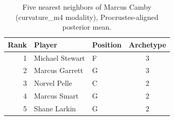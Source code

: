 \begin{table}[htbp]
  \centering\small
  \begin{tabular}{rllc}
    \toprule
    Rank & Player & Position & Archetype \\
    \midrule
    1 & Michael Stewart & F & 3 \\
    2 & Marcus Garrett & G & 3 \\
    3 & Norvel Pelle & C & 2 \\
    4 & Marcus Smart & G & 2 \\
    5 & Shane Larkin & G & 2 \\
    \bottomrule
  \end{tabular}
  \caption{Five nearest neighbors of Marcus Camby (curvature_m4 modality), Procrustes-aligned posterior mean.}
  \label{tab:Marcus_Camby_neighbors_curvature_m4}
\end{table}

